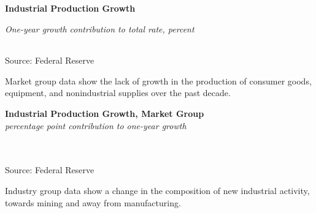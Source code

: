 \documentclass{report}
\makeatletter
\newcommand{\tbllink}[1]{\href{https://raw.githubusercontent.com/bdecon/US-chartbook/master/chartbook/data/#1}{\faTable}}
\newcommand*\short[1]{\expandafter\@gobbletwo\number\numexpr#1\relax}
\newcommand{\sbar}[4]{
		\addplot[ybar stacked, bar width=2.5pt, draw opacity=0, fill=#1] 
			table [x=#2, y=#3, col sep=comma]{#4};}
\newcommand{\dateaxisticks}{
		date coordinates in=x, axis line style={draw=none},
		xmax={2021-06-15},
		max space between ticks=40,	    
		xtick={{1990-01-01}, {1992-01-01}, {1994-01-01}, 
			{1996-01-01}, {1998-01-01}, {2000-01-01}, 
			{2002-01-01}, {2004-01-01}, {2006-01-01},
			{2008-01-01}, {2010-01-01}, {2012-01-01}, {2014-01-01},
		    {2016-01-01}, {2018-01-01}, {2020-01-01}},
		minor xtick={{1989-01-01}, {1991-01-01}, {1993-01-01},
			{1995-01-01}, {1997-01-01}, {1999-01-01}, 
			{2001-01-01}, {2003-01-01}, {2005-01-01}, {2007-01-01},
		    {2009-01-01}, {2011-01-01}, {2013-01-01}, {2015-01-01},
		    {2017-01-01}, {2019-01-01}, {2021-01-01}},
		enlarge y limits={0.06}, enlarge x limits={0.01},
		}
\newcommand{\bbar}[2]{extra #1 ticks = {{#2}}, extra #1 tick labels = ,
		extra #1 tick style = {grid=major, grid style={thick, black!25}},}
\newcommand{\rbars}{
		\fill[color=black!10] (axis cs:{1990-07-01},\pgfkeysvalueof{/pgfplots/ymin}) rectangle 
			(axis cs:{1991-03-01}, \pgfkeysvalueof{/pgfplots/ymax});
		\fill[color=black!10] (axis cs:{2007-12-01},\pgfkeysvalueof{/pgfplots/ymin}) rectangle 
			(axis cs:{2009-07-01}, \pgfkeysvalueof{/pgfplots/ymax});
		\fill[color=black!10] (axis cs:{2001-03-01},\pgfkeysvalueof{/pgfplots/ymin}) rectangle 
			(axis cs:{2001-11-01}, \pgfkeysvalueof{/pgfplots/ymax});
		\fill[color=black!10] (axis cs:{2020-02-01},\pgfkeysvalueof{/pgfplots/ymin}) rectangle 
			(axis cs:{2021-06-15}, \pgfkeysvalueof{/pgfplots/ymax});}
\makeatother
\begin{document}
{\begin{minipage}{0.76\textwidth}
\normalsize \textbf{Industrial Production Growth}\\
\footnotesize{\textit{One-year growth \hspace{34mm} contribution to total \hspace{12mm} rate, percent}\\
\noindent {} \setlength{\tabcolsep}{3.1pt} \color{black!90}
		{\renewcommand{\arraystretch}{1.54}
		 \begin{tabular}{p{2mm} p{44mm} R{7.3mm} R{7.3mm} R{7.3mm} R{7.3mm} | R{8mm} R{7.3mm} 
		   R{7.3mm} R{7.3mm} }
			  \hline
		\end{tabular}}\vspace{-2mm}
		
\footnotesize{Source: Federal Reserve}}
\end{minipage}
\newpage
\begin{minipage}{0.76\textwidth}
\vspace{3mm}
\small Market group data show the lack of growth in the production of consumer goods, equipment, and nonindustrial supplies over the past decade.
\vspace{1mm}

\normalsize \textbf{Industrial Production Growth, Market Group}\\
\footnotesize{\textit{percentage point contribution to one-year growth}}\\\
\hspace*{-2mm} \\
\footnotesize{Source: Federal Reserve} \hfill \tbllink{indprogr.csv}
\vspace{3mm}

\small Industry group data show a change in the composition of new industrial activity, towards mining and away from manufacturing.
\vspace{1mm}


\end{minipage}}
\end{document}
